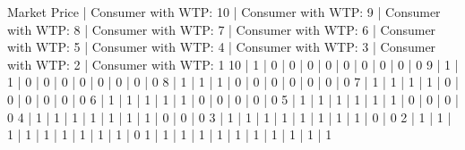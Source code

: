 \documentclass[letterpaper,10pt,english]{jupyterBook}
\begin{document}
\begin{sphinxVerbatim}[commandchars=\\\{\}]
Market Price | Consumer with WTP: 10 | Consumer with WTP: 9 | Consumer with WTP: 8 | Consumer with WTP: 7 | Consumer with WTP: 6 | Consumer with WTP: 5 | Consumer with WTP: 4 | Consumer with WTP: 3 | Consumer with WTP: 2 | Consumer with WTP: 1
10           | 1                     | 0                    | 0                    | 0                    | 0                    | 0                    | 0                    | 0                    | 0                    | 0
9            | 1                     | 1                    | 0                    | 0                    | 0                    | 0                    | 0                    | 0                    | 0                    | 0
8            | 1                     | 1                    | 1                    | 0                    | 0                    | 0                    | 0                    | 0                    | 0                    | 0
7            | 1                     | 1                    | 1                    | 1                    | 0                    | 0                    | 0                    | 0                    | 0                    | 0
6            | 1                     | 1                    | 1                    | 1                    | 1                    | 0                    | 0                    | 0                    | 0                    | 0
5            | 1                     | 1                    | 1                    | 1                    | 1                    | 1                    | 0                    | 0                    | 0                    | 0
4            | 1                     | 1                    | 1                    | 1                    | 1                    | 1                    | 1                    | 0                    | 0                    | 0
3            | 1                     | 1                    | 1                    | 1                    | 1                    | 1                    | 1                    | 1                    | 0                    | 0
2            | 1                     | 1                    | 1                    | 1                    | 1                    | 1                    | 1                    | 1                    | 1                    | 0
1            | 1                     | 1                    | 1                    | 1                    | 1                    | 1                    | 1                    | 1                    | 1                    | 1
\end{sphinxVerbatim}
\end{document}
